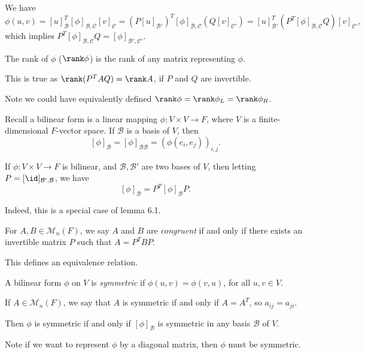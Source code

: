 \documentclass[12pt]{article}
\begin{document}
\begin{proofbox}
	We have
\[
	\phi(u, v) = [u]_{\mathcal{B}}^{T} [\phi]_{\mathcal{B}, \mathcal{C}}[v]_{\mathcal{C}} = (P[u]_{\mathcal{B}'})^{T}[\phi]_{\mathcal{B},\mathcal{C}}(Q[v]_{\mathcal{C}'}) = [u]_{\mathcal{B}'}^{T} (P^{T} [\phi]_{\mathcal{B}, \mathcal{C}} Q)[v]_{\mathcal{C}'}
,\]
which implies $P^{T}[\phi]_{\mathcal{B}, \mathcal{C}}Q = [\phi]_{\mathcal{B}', \mathcal{C}'}$.
\end{proofbox}

\begin{definition}
	The rank of $\phi$ ($\rank \phi$) is the rank of any matrix representing $\phi$.
\end{definition}

This is true as $\rank (P^{T}AQ) = \rank A$, if $P$ and $Q$ are invertible.

Note we could have equivalently defined $\rank \phi = \rank \phi_L = \rank \phi_R$.

Recall a bilinear form is a linear mapping $\phi : V \times V \to F$, where $V$ is a finite-dimensional $F$-vector space. If $\mathcal{B}$ is a basis of $V$, then
\[
	[\phi]_{\mathcal{B}} = [\phi]_{\mathcal{B}\mathcal{B}} = (\phi(e_i, e_j))_{i,j}
.\]

\begin{lemma}
	If $\phi : V \times V \to F$ is bilinear, and $\mathcal{B}, \mathcal{B}'$ are two bases of $V$, then letting $P = [\id]_{\mathcal{B}',\mathcal{B}}$, we have
	\[
		[\phi]_{\mathcal{B}} = P^{T}[\phi]_{\mathcal{B}}P
	.\] 
\end{lemma}

Indeed, this is a special case of lemma 6.1.

\begin{definition}
	For $A, B \in \mathcal{M}_n(F)$, we say $A$ and $B$ are \textit{congruent} if and only if there exists an invertible matrix $P$ such that $A = P^{T}BP$.
\end{definition}
\begin{remark}
	This defines an equivalence relation.
\end{remark}

\begin{definition}
	A bilinear form $\phi$ on $V$ is \textit{symmetric} if $\phi(u, v) = \phi(v, u)$, for all $u, v \in V$.
\end{definition}
\begin{remark}
	If $A \in \mathcal{M}_n(F)$, we say that $A$ is symmetric if and only if $A = A^{T}$, so $a_{ij} = a_{ji}$.

	Then $\phi$ is symmetric if and only if $[\phi]_{\mathcal{B}}$ is symmetric in any basis $\mathcal{B}$ of $V$.

	Note if we want to represent $\phi$ by a diagonal matrix, then $\phi$ must be symmetric.
\end{remark}
\end{document}
